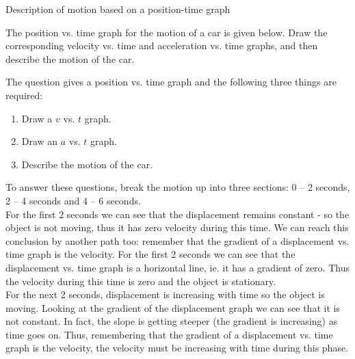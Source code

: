 \begin{wex}{Description of motion based on a position-time graph}{The position vs. time graph for the motion of a car is given below. Draw the corresponding velocity vs. time and acceleration vs. time graphs, and then describe the motion of the car.
\begin{center}
\end{center}
}{%
The question gives a position vs. time graph and the following three things are required:
\begin{enumerate}[label=\textbf{\arabic*}.]
\item Draw a $v$ vs. $t$ graph.
\item Draw an $a$ vs. $t$ graph.
\item Describe the motion of the car.
\end{enumerate}
To answer these questions, break the motion up into three sections: 0 -- 2 seconds, 2 -- 4 seconds and 4 -- 6 seconds.\\

For the first 2 seconds we can see that the displacement remains constant - so the object is not moving, thus it has zero velocity during this time. We can reach this conclusion by another path too: remember that the gradient of a displacement vs. time graph is the velocity. For the first 2 seconds we can see that the displacement vs. time graph is a horizontal line, ie. it has a gradient of zero. Thus the velocity during this time is zero and the object is stationary.\\

For the next 2 seconds, displacement is increasing with time so the object is moving. Looking at the gradient of the displacement graph we can see that it is not constant. In fact, the slope is getting steeper (the gradient is increasing) as time goes on. Thus, remembering that the gradient of a displacement vs. time graph is the velocity, the velocity must be increasing with time during this phase.\\

}
\end{wex}
